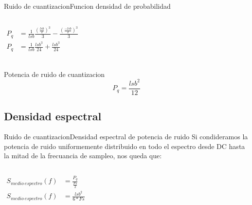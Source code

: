 \begin{darkframes}
\begin{frame}{Ruido de cuantizacion}{Funcion densidad de probabilidad}
\begin{columns}[onlytextwidth]
\begin{align*}
            P_q &= \frac{1}{lsb} \frac{(\frac{lsb}{2})^3}{3} - \frac{(\frac{-lsb}{2})^3}{3} \\
            P_q &= \frac{1}{lsb} \frac{lsb^3}{24} + \frac{lsb^3}{24} \\
         \end{align*}
      \end{columns}
      \begin{block}{Potencia de ruido de cuantizacion}
         \begin{equation}
            P_q = \frac{lsb^2}{12}
         \end{equation}
      \end{block}
      \vfill
   \end{frame}
   \subsection{Densidad espectral}
   \begin{frame}{Ruido de cuantizacion}{Densidad espectral de potencia de ruido}
      Si condideramos la potencia de ruido uniformemente distribuido en todo el espectro desde DC hasta la mitad de la frecuancia de sampleo, nos queda que:
      \begin{columns}[onlytextwidth]
         \begin{align*}
            S_{medio\ espectro}(f) &= \frac{P_q}{\frac{Fs}{2}} \\
            S_{medio\ espectro}(f) &= \frac{lsb^2}{6*Fs}
         \end{align*}
      \end{columns}
      \vfill
   \end{frame}

\end{darkframes}
